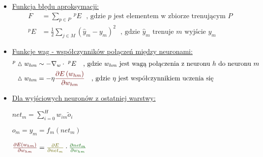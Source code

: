 \documentclass[10pt, a4paper]{article}
\def\layersep{2.5cm}
\begin{document}
\begin{center}
\begin{itemize}


\item[]
\underline{Funkcja błędu aproksymacji:}
\begin{align*}
F &= \sum_{p \in P} \ ^pE \ \ \ \text{, gdzie $p$ jest elementem w zbiorze trenującym $P$} \\
^p E &= \frac{1}{2} \sum_{j \in M} \left(\hat{y}_m - y_m \right)^2 \ \ \ \text{, gdzie $\hat{y}_m$ trenuje $m$ wyjście $y_m$}
\end{align*}

\item[]
\underline{Funkcje wag - współczynników połączeń między neuronami:}
\begin{align*}
^p \vartriangle w_{hm} &\sim - \nabla_w \cdot \ ^p E \ \ \ \text{, gdzie $w_{hm}$ jest wagą połączenia z neuronu $h$ do neuronu $m$} \\
\vartriangle w_{hm} &= - \eta \textcolor{red}{\frac{\partial E \left( w_{hm} \right) }{ \partial w_{hm}} } \ \ \ \text{, gdzie $\eta$ jest współczynnikiem uczenia się}
\end{align*}

\item[]
\underline{Dla wyjściowych neuronów z ostatniej warstwy:}

$net_m = \sum_{i=0}^H w_{im} \tilde{o}_i$

$o_m = y_m = f_m(net_m) $

$ \textcolor{red}{\frac{\partial E \left( w_{hm} \right) }{ \partial w_{hm} }} = \textcolor{magenta}{\frac{\partial E }{ \partial net_m }} \cdot \textcolor{green}{\frac{ \partial net_m }{ \partial w_{hm} }}$


\end{itemize}
\end{center}
\end{document}
